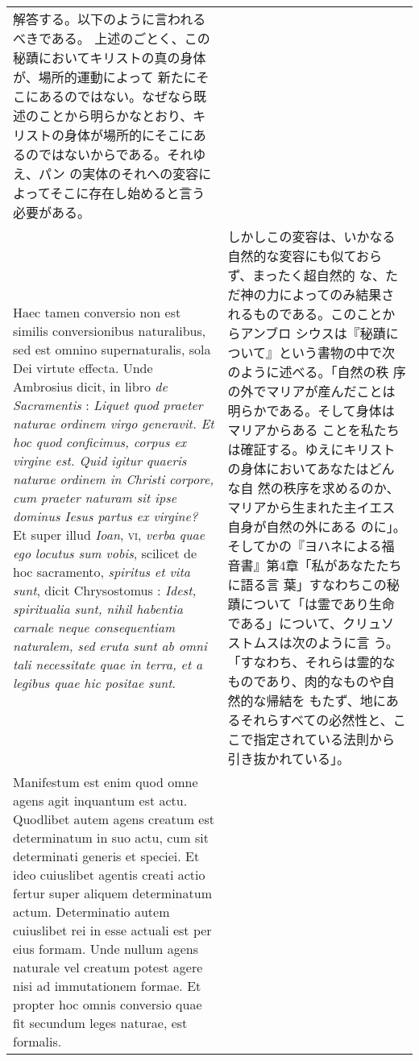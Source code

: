 \documentclass[10pt]{jsarticle} %
\begin{document}
\begin{longtable}{p{21em}p{21em}}
解答する。以下のように言われるべきである。
上述のごとく、この秘蹟においてキリストの真の身体が、場所的運動によって
 新たにそこにあるのではない。なぜなら既述のことから明らかなとおり、キ
 リストの身体が場所的にそこにあるのではないからである。それゆえ、パン
 の実体のそれへの変容によってそこに存在し始めると言う必要がある。


\\



Haec tamen conversio non est
similis conversionibus naturalibus, sed est omnino supernaturalis,
sola Dei virtute effecta. Unde Ambrosius dicit, in libro {\itshape de
Sacramentis} : {\itshape Liquet quod praeter naturae ordinem virgo generavit. Et
hoc quod conficimus, corpus ex virgine est. Quid igitur quaeris
naturae ordinem in Christi corpore, cum praeter naturam sit ipse
dominus Iesus partus ex virgine?} Et super illud {\itshape Ioan}, {\scshape vi}, {\itshape verba quae
ego locutus sum vobis}, scilicet de hoc sacramento, {\itshape spiritus et vita
sunt}, dicit Chrysostomus : {\itshape Idest, spiritualia sunt, nihil habentia
carnale neque consequentiam naturalem, sed eruta sunt ab omni tali
necessitate quae in terra, et a legibus quae hic positae
sunt}. 

&

しかしこの変容は、いかなる自然的な変容にも似ておらず、まったく超自然的
 な、ただ神の力によってのみ結果されるものである。このことからアンブロ
 シウスは『秘蹟について』という書物の中で次のように述べる。「自然の秩
 序の外でマリアが産んだことは明らかである。そして身体はマリアからある
 ことを私たちは確証する。ゆえにキリストの身体においてあなたはどんな自
 然の秩序を求めるのか、マリアから生まれた主イエス自身が自然の外にある
 のに」。そしてかの『ヨハネによる福音書』第4章「私があなたたちに語る言
 葉」すなわちこの秘蹟について「は霊であり生命である」について、クリュソストムスは次のように言
 う。「すなわち、それらは霊的なものであり、肉的なものや自然的な帰結を
 もたず、地にあるそれらすべての必然性と、ここで指定されている法則から
 引き抜かれている」。


\\



Manifestum est enim quod omne agens agit inquantum est
actu. Quodlibet autem agens creatum est determinatum in suo actu, cum
sit determinati generis et speciei. Et ideo cuiuslibet agentis creati
actio fertur super aliquem determinatum actum. Determinatio autem
cuiuslibet rei in esse actuali est per eius formam. Unde nullum agens
naturale vel creatum potest agere nisi ad immutationem formae. 
Et propter hoc omnis conversio quae fit secundum leges naturae, est
formalis.
&


\end{longtable}
\end{document}
